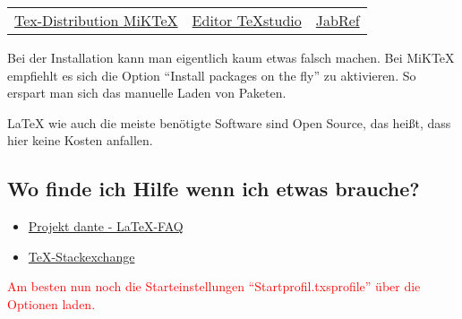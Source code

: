 \begin{center}
	\begin{tabular}{ccc}
	\href{https://miktex.org/}{Tex-Distribution MiKTeX} &
	\href{https://www.texstudio.org/}{Editor TeXstudio} &
	\href{http://www.jabref.org/}{JabRef} \\
\end{tabular}
\end{center}

Bei der Installation kann man eigentlich kaum etwas falsch machen. Bei MiKTeX empfiehlt es sich die Option "`Install packages on the fly"' zu aktivieren. So erspart man sich das manuelle Laden von Paketen. 

{\LaTeX} wie auch die meiste benötigte Software sind Open Source, das heißt, dass hier keine Kosten anfallen.

\subsection{Wo finde ich Hilfe wenn ich etwas brauche? 
	\label{sec:latex_hilfe}}
\begin{itemize}
	\item \href{http://projekte.dante.de/DanteFAQ/WebHome}{Projekt dante - \LaTeX -FAQ}
	\item \href{https://tex.stackexchange.com/}{TeX-Stackexchange}
\end{itemize}
\textcolor{red}{Am besten nun noch die Starteinstellungen "`Startprofil.txsprofile"' über die Optionen laden.}
\clearpage

